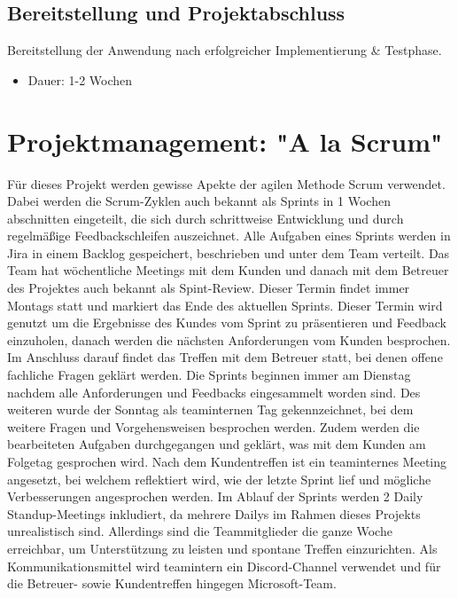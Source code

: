 \documentclass[a4paper,12pt]{article}
\begin{document}
\subsection{Bereitstellung und Projektabschluss}
Bereitstellung der Anwendung nach erfolgreicher Implementierung \& Testphase.
\begin{itemize}
    \item Dauer: 1-2 Wochen
\end{itemize}
\newpage
\section{Projektmanagement: "A la Scrum"}
Für dieses Projekt werden gewisse Apekte der agilen Methode Scrum verwendet. Dabei werden die Scrum-Zyklen auch bekannt als Sprints in 1 Wochen abschnitten eingeteilt, die sich durch schrittweise Entwicklung und durch regelmäßige Feedbackschleifen auszeichnet. Alle Aufgaben eines Sprints werden in Jira in einem Backlog gespeichert, beschrieben und unter dem Team verteilt.
\newline
\newline
Das Team hat wöchentliche Meetings mit dem Kunden und danach mit dem Betreuer des Projektes auch bekannt als Spint-Review. Dieser Termin findet immer Montags statt und markiert das Ende des aktuellen Sprints. Dieser Termin wird genutzt um die Ergebnisse des Kundes vom Sprint zu präsentieren und Feedback einzuholen, danach werden die nächsten Anforderungen vom Kunden besprochen. Im Anschluss darauf findet das Treffen mit dem Betreuer statt, bei denen offene fachliche Fragen geklärt werden. 
\newline
\newline
Die Sprints beginnen immer am Dienstag nachdem alle Anforderungen und Feedbacks eingesammelt worden sind. Des weiteren wurde der Sonntag als teaminternen Tag gekennzeichnet, bei dem weitere Fragen und Vorgehensweisen besprochen werden. Zudem werden die bearbeiteten Aufgaben durchgegangen und geklärt, was mit dem Kunden am Folgetag gesprochen wird. Nach dem Kundentreffen ist ein teaminternes Meeting angesetzt, bei welchem reflektiert wird, wie der letzte Sprint lief und mögliche Verbesserungen angesprochen werden. 
\newline
\newline
Im Ablauf der Sprints werden 2 Daily Standup-Meetings inkludiert, da mehrere Dailys im Rahmen dieses Projekts unrealistisch sind. Allerdings sind die Teammitglieder die ganze Woche erreichbar, um Unterstützung zu leisten und spontane Treffen einzurichten. Als Kommunikationsmittel wird teamintern ein Discord-Channel verwendet und für die Betreuer- sowie Kundentreffen hingegen Microsoft-Team.
\newpage
\end{document}
